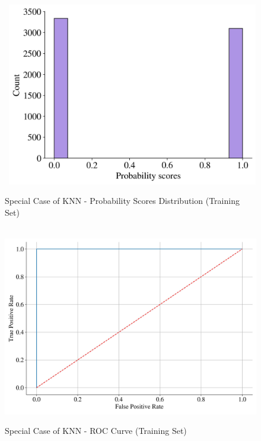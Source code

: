 \begin{figure}[H]
    \centering
    \caption{Special Case of KNN - Probability Scores Distribution (Training Set)}\vspace{0.5em}
    \label{fig:knndist}\
    \includegraphics[width=110mm]{Figures/KNN_special_prob.jpg}
    
    \vspace{-1em}
\end{figure}



\begin{figure}[H]
    \centering
    \caption{Special Case of KNN - ROC Curve (Training Set)}\vspace{0.5em}
    \label{fig:knnroc}\
    \includegraphics[width=140mm]{Figures/KNN_special_ROC.jpg}
    
    \vspace{-1em}
\end{figure}




